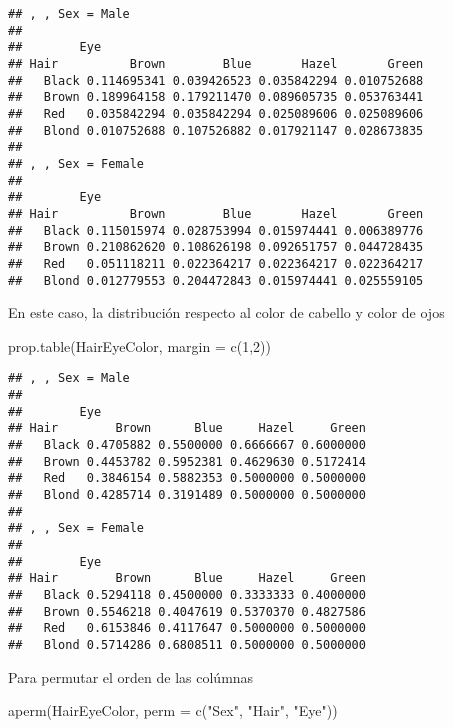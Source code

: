 \documentclass[
]{article}
\newenvironment{Shaded}{\begin{snugshade}}{\end{snugshade}}
\newcommand{\AttributeTok}[1]{\textcolor[rgb]{0.77,0.63,0.00}{#1}}
\newcommand{\DecValTok}[1]{\textcolor[rgb]{0.00,0.00,0.81}{#1}}
\newcommand{\FunctionTok}[1]{\textcolor[rgb]{0.00,0.00,0.00}{#1}}
\newcommand{\NormalTok}[1]{#1}
\newcommand{\StringTok}[1]{\textcolor[rgb]{0.31,0.60,0.02}{#1}}
\begin{document}
\begin{verbatim}
## , , Sex = Male
## 
##        Eye
## Hair          Brown        Blue       Hazel       Green
##   Black 0.114695341 0.039426523 0.035842294 0.010752688
##   Brown 0.189964158 0.179211470 0.089605735 0.053763441
##   Red   0.035842294 0.035842294 0.025089606 0.025089606
##   Blond 0.010752688 0.107526882 0.017921147 0.028673835
## 
## , , Sex = Female
## 
##        Eye
## Hair          Brown        Blue       Hazel       Green
##   Black 0.115015974 0.028753994 0.015974441 0.006389776
##   Brown 0.210862620 0.108626198 0.092651757 0.044728435
##   Red   0.051118211 0.022364217 0.022364217 0.022364217
##   Blond 0.012779553 0.204472843 0.015974441 0.025559105
\end{verbatim}

En este caso, la distribución respecto al color de cabello y color de
ojos

\begin{Shaded}
\begin{Highlighting}[]
\FunctionTok{prop.table}\NormalTok{(HairEyeColor, }\AttributeTok{margin =} \FunctionTok{c}\NormalTok{(}\DecValTok{1}\NormalTok{,}\DecValTok{2}\NormalTok{))}
\end{Highlighting}
\end{Shaded}

\begin{verbatim}
## , , Sex = Male
## 
##        Eye
## Hair        Brown      Blue     Hazel     Green
##   Black 0.4705882 0.5500000 0.6666667 0.6000000
##   Brown 0.4453782 0.5952381 0.4629630 0.5172414
##   Red   0.3846154 0.5882353 0.5000000 0.5000000
##   Blond 0.4285714 0.3191489 0.5000000 0.5000000
## 
## , , Sex = Female
## 
##        Eye
## Hair        Brown      Blue     Hazel     Green
##   Black 0.5294118 0.4500000 0.3333333 0.4000000
##   Brown 0.5546218 0.4047619 0.5370370 0.4827586
##   Red   0.6153846 0.4117647 0.5000000 0.5000000
##   Blond 0.5714286 0.6808511 0.5000000 0.5000000
\end{verbatim}

Para permutar el orden de las colúmnas

\begin{Shaded}
\begin{Highlighting}[]
\FunctionTok{aperm}\NormalTok{(HairEyeColor, }\AttributeTok{perm =} \FunctionTok{c}\NormalTok{(}\StringTok{"Sex"}\NormalTok{, }\StringTok{"Hair"}\NormalTok{, }\StringTok{"Eye"}\NormalTok{))}
\end{Highlighting}
\end{Shaded}
\end{document}
